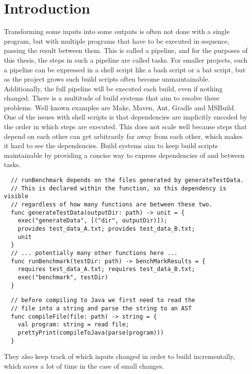 
\section{Introduction}
\label{sec:introduction}

Transforming some inputs into some outputs is often not done with a single program, but with multiple programs that have to be executed in sequence, passing the result between them.
This is called a pipeline, and for the purposes of this thesis, the steps in such a pipeline are called tasks.
For smaller projects, such a pipeline can be expressed in a shell script like a bash script or a bat script, but as the project grows such build scripts often become unmaintainable.\autocites{Hatch2018}{Moodie2006}
Additionally, the full pipeline will be executed each build, even if nothing changed.
There is a multitude of build systems that aim to resolve these problems.
Well known examples are Make, Maven, Ant, Gradle and MSBuild.\missingref
One of the issues with shell scripts is that dependencies are implicitly encoded by the order in which steps are executed.
This does not scale well because steps that depend on each other can get arbitrarily far away from each other, which makes it hard to see the dependencies.
Build systems aim to keep build scripts maintainable by providing a concise way to express dependencies of and between tasks.
\begin{lstlisting}
  // runBenchmark depends on the files generated by generateTestData.
  // This is declared within the function, so this dependency is visible
  // regardless of how many functions are between these two.
  func generateTestData(outputDir: path) -> unit = {
    exec("generateData", [("dir", outputDir)]);
    provides test_data_A.txt; provides test_data_B.txt;
    unit
  }
  // ... potentially many other functions here ...
  func runBenchmark(testDir: path) -> benchMarkResults = {
    requires test_data_A.txt; requires test_data_B.txt;
    exec("benchmark", testDir)
  }
\end{lstlisting}
\begin{lstlisting}
  // before compiling to Java we first need to read the
  // file into a string and parse the string to an AST
  func compileFile(file: path) -> string = {
    val program: string = read file;
    prettyPrint(compileToJava(parse(program)))
  }
\end{lstlisting}
They also keep track of which inputs changed in order to build incrementally, which saves a lot of time in the case of small changes.


